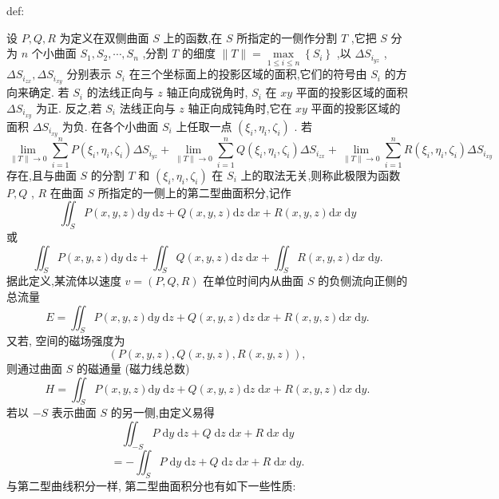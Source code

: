 \begin{definition}{}{def:}

\end{definition}
设 \(P,Q,R\) 为定义在双侧曲面 \(S\) 上的函数,在 \(S\) 所指定的一侧作分割 \(T\) ,它把 \(S\) 分为 \(n\) 个小曲面 \({S}_{1},{S}_{2},\cdots ,{S}_{n}\) ,分割 \(T\) 的细度 \(\parallel T\parallel  = \mathop{\max }\limits_{{1 \leq  i \leq  n}}\left\{  {S}_{i}\right\}\) ,以 \(\Delta {S}_{{i}_{yz}}\) , \(\Delta {S}_{{i}_{zx}},\Delta {S}_{{i}_{xy}}\) 分别表示 \({S}_{i}\) 在三个坐标面上的投影区域的面积,它们的符号由 \({S}_{i}\) 的方向来确定. 若 \({S}_{i}\) 的法线正向与 \(z\) 轴正向成锐角时, \({S}_{i}\) 在 \({xy}\) 平面的投影区域的面积 \(\Delta {S}_{{i}_{xy}}\) 为正. 反之,若 \({S}_{i}\) 法线正向与 \(z\) 轴正向成钝角时,它在 \({xy}\) 平面的投影区域的面积 \(\Delta {S}_{{i}_{xy}}\) 为负. 在各个小曲面 \({S}_{i}\) 上任取一点 \(\left( {{\xi }_{i},{\eta }_{i},{\zeta }_{i}}\right)\) . 若
\[
\mathop{\lim }\limits_{{\parallel T\parallel  \rightarrow  0}}\mathop{\sum }\limits_{{i = 1}}^{n}P\left( {{\xi }_{i},{\eta }_{i},{\zeta }_{i}}\right) \Delta {S}_{{i}_{yz}} + \mathop{\lim }\limits_{{\parallel T\parallel  \rightarrow  0}}\mathop{\sum }\limits_{{i = 1}}^{n}Q\left( {{\xi }_{i},{\eta }_{i},{\zeta }_{i}}\right) \Delta {S}_{{i}_{zx}} + \mathop{\lim }\limits_{{\parallel T\parallel  \rightarrow  0}}\mathop{\sum }\limits_{{i = 1}}^{n}R\left( {{\xi }_{i},{\eta }_{i},{\zeta }_{i}}\right) \Delta {S}_{{i}_{xy}}
\]
存在,且与曲面 \(S\) 的分割 \(T\) 和 \(\left( {{\xi }_{i},{\eta }_{i},{\zeta }_{i}}\right)\) 在 \({S}_{i}\) 上的取法无关,则称此极限为函数 \(P,Q\) , \(R\) 在曲面 \(S\) 所指定的一侧上的第二型曲面积分,记作
\[
{\iint }_{S}P\left( {x,y,z}\right) \mathrm{d}y\mathrm{\;d}z + Q\left( {x,y,z}\right) \mathrm{d}z\mathrm{\;d}x + R\left( {x,y,z}\right) \mathrm{d}x\mathrm{\;d}y \tag{1}
\]
或
\[
{\iint }_{S}P\left( {x,y,z}\right) \mathrm{d}y\mathrm{\;d}z + {\iint }_{S}Q\left( {x,y,z}\right) \mathrm{d}z\mathrm{\;d}x + {\iint }_{S}R\left( {x,y,z}\right) \mathrm{d}x\mathrm{\;d}y.
\]
据此定义,某流体以速度 \(v = \left( {P,Q,R}\right)\) 在单位时间内从曲面 \(S\) 的负侧流向正侧的总流量
\[
E = {\iint }_{S}P\left( {x,y,z}\right) \mathrm{d}y\mathrm{\;d}z + Q\left( {x,y,z}\right) \mathrm{d}z\mathrm{\;d}x + R\left( {x,y,z}\right) \mathrm{d}x\mathrm{\;d}y.
\]
又若, 空间的磁场强度为
\[
\left( {P\left( {x,y,z}\right) ,Q\left( {x,y,z}\right) ,R\left( {x,y,z}\right) }\right) ,
\]
则通过曲面 \(S\) 的磁通量 (磁力线总数)
\[
H = {\iint }_{S}P\left( {x,y,z}\right) \mathrm{d}y\mathrm{\;d}z + Q\left( {x,y,z}\right) \mathrm{d}z\mathrm{\;d}x + R\left( {x,y,z}\right) \mathrm{d}x\mathrm{\;d}y.
\]
若以 \(- S\) 表示曲面 \(S\) 的另一侧,由定义易得
\[
{\iint }_{-S}P\mathrm{\;d}y\mathrm{\;d}z + Q\mathrm{\;d}z\mathrm{\;d}x + R\mathrm{\;d}x\mathrm{\;d}y
\]
\[
=  - {\iint }_{S}P\mathrm{\;d}y\mathrm{\;d}z + Q\mathrm{\;d}z\mathrm{\;d}x + R\mathrm{\;d}x\mathrm{\;d}y.
\]
与第二型曲线积分一样, 第二型曲面积分也有如下一些性质:

